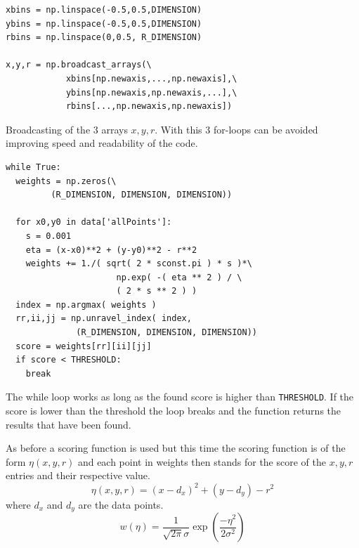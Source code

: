 \documentclass[11pt,twoside]{scrreprt}
\begin{document}
\begin{codesnippet}[htbp]
  \begin{lstlisting}
xbins = np.linspace(-0.5,0.5,DIMENSION)
ybins = np.linspace(-0.5,0.5,DIMENSION)
rbins = np.linspace(0,0.5, R_DIMENSION)

x,y,r = np.broadcast_arrays(\
            xbins[np.newaxis,...,np.newaxis],\
            ybins[np.newaxis,np.newaxis,...],\
            rbins[...,np.newaxis,np.newaxis])
\end{lstlisting}
\caption[3D broadcasting]{Broadcasting of the 3 arrays $x,y,r$. With this 3 for-loops can be avoided improving speed and readability
of the code.}
\label{pc:3D_broadcasting}
\end{codesnippet}

\begin{codesnippet}[htbp]
  \begin{lstlisting}
while True:
  weights = np.zeros(\
         (R_DIMENSION, DIMENSION, DIMENSION))

  for x0,y0 in data['allPoints']:
    s = 0.001
    eta = (x-x0)**2 + (y-y0)**2 - r**2
    weights += 1./( sqrt( 2 * sconst.pi ) * s )*\
                      np.exp( -( eta ** 2 ) / \
                      ( 2 * s ** 2 ) )
  index = np.argmax( weights )
  rr,ii,jj = np.unravel_index( index, 
              (R_DIMENSION, DIMENSION, DIMENSION))
  score = weights[rr][ii][jj]
  if score < THRESHOLD:
    break  
\end{lstlisting}
\caption[Calculation of weights and threshold check for 3D HT]{The while loop works as long as the found score is higher than
\texttt{THRESHOLD}. If the score is lower than the threshold the loop breaks and the function returns the results that have been found.}
\label{pc:3D_threshold}
\end{codesnippet}

As before a scoring function is used but this time the scoring function is of the form $\eta(x,y,r)$ and each point in weights then stands
for the score of the $x,y,r$ entries and their respective value.
\begin{equation}
  \eta(x,y,r) = (x - d_x)^2 + (y - d_y) - r ^ 2
\end{equation}
where $d_x$ and $d_y$ are the data points.
\begin{equation}
  w(\eta) = \frac{1}{\sqrt{2\pi}\sigma}\exp\left( \frac{-\eta^2}{2\sigma^2}\right)
\end{equation}
\end{document}
